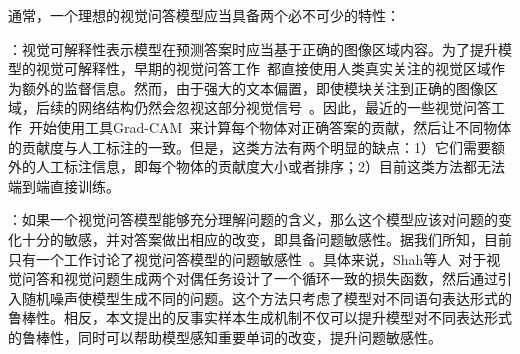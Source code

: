 通常，一个理想的视觉问答模型应当具备两个必不可少的特性：

\textbf{}：视觉可解释性表示模型在预测答案时应当基于正确的图像区域内容。为了提升模型的视觉可解释性，早期的视觉问答工作~\cite{qiao2018exploring,liu2017attention,zhang2019interpretable}都直接使用人类真实关注的视觉区域作为额外的监督信息。然而，由于强大的文本偏置，即使模块关注到正确的图像区域，后续的网络结构仍然会忽视这部分视觉信号~\cite{selvaraju2019taking}。因此，最近的一些视觉问答工作~\cite{selvaraju2019taking,wu2019self}开始使用工具Grad-CAM~\cite{selvaraju2017grad}来计算每个物体对正确答案的贡献，然后让不同物体的贡献度与人工标注的一致。但是，这类方法有两个明显的缺点：1）它们需要额外的人工标注信息，即每个物体的贡献度大小或者排序；2）目前这类方法都无法端到端直接训练。

\textbf{}：如果一个视觉问答模型能够充分理解问题的含义，那么这个模型应该对问题的变化十分的敏感，并对答案做出相应的改变，即具备问题敏感性。据我们所知，目前只有一个工作讨论了视觉问答模型的问题敏感性~\cite{shah2019cycle}。具体来说，Shah等人~\cite{shah2019cycle}对于视觉问答和视觉问题生成两个对偶任务设计了一个循环一致的损失函数，然后通过引入随机噪声使模型生成不同的问题。这个方法只考虑了模型对不同语句表达形式的鲁棒性。相反，本文提出的反事实样本生成机制不仅可以提升模型对不同表达形式的鲁棒性，同时可以帮助模型感知重要单词的改变，提升问题敏感性。


